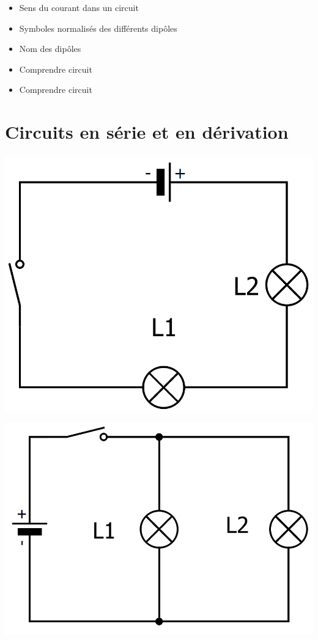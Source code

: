 \documentclass[12pt,a4paper]{article}
\begin{document}
\begin{myexos}
	\begin{itemize}
		\item {} Sens du courant dans un circuit
		\item {} Symboles normalisés des différents dipôles
		\item {} Nom des dipôles
		\item {} Comprendre circuit
		\item {} Comprendre circuit
	\end{itemize}
\end{myexos}

\section{Circuits en série et en dérivation}





\begin{multicols}{2}
	\begin{center}
		\includegraphics[scale=0.25]{img/serie}
	\end{center}

	\begin{center}
		\includegraphics[scale=0.25]{img/drv}
	\end{center}
\end{multicols}
\end{document}
